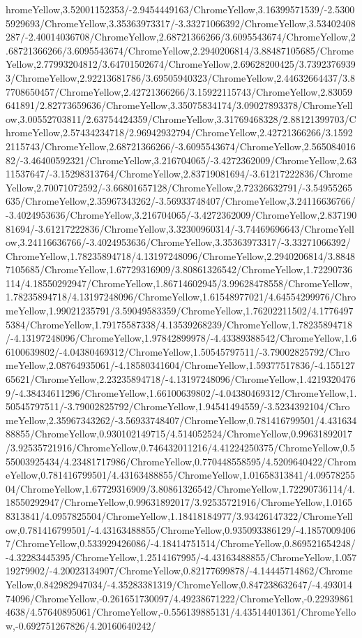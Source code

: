 {\begin{tikzternal}
hromeYellow,3.52001152353/-2.9454449163/ChromeYellow,3.16399571539/-2.53005929693/ChromeYellow,3.35363973317/-3.33271066392/ChromeYellow,3.53402408287/-2.40014036708/ChromeYellow,2.68721366266/3.6095543674/ChromeYellow,2.68721366266/3.6095543674/ChromeYellow,2.2940206814/3.88487105685/ChromeYellow,2.77993204812/3.64701502674/ChromeYellow,2.69628200425/3.73923769393/ChromeYellow,2.92213681786/3.69505940323/ChromeYellow,2.44632664437/3.87708650457/ChromeYellow,2.42721366266/3.15922115743/ChromeYellow,2.83059641891/2.82773659636/ChromeYellow,3.35075834174/3.09027893378/ChromeYellow,3.00552703811/2.63754424359/ChromeYellow,3.31769468328/2.88121399703/ChromeYellow,2.57434234718/2.96942932794/ChromeYellow,2.42721366266/3.15922115743/ChromeYellow,2.68721366266/-3.6095543674/ChromeYellow,2.56508401682/-3.46400592321/ChromeYellow,3.216704065/-3.4272362009/ChromeYellow,2.6311537647/-3.15298313764/ChromeYellow,2.83719081694/-3.61217222836/ChromeYellow,2.70071072592/-3.66801657128/ChromeYellow,2.72326632791/-3.54955265635/ChromeYellow,2.35967343262/-3.56933748407/ChromeYellow,3.24116636766/-3.4024953636/ChromeYellow,3.216704065/-3.4272362009/ChromeYellow,2.83719081694/-3.61217222836/ChromeYellow,3.32300960314/-3.74469696643/ChromeYellow,3.24116636766/-3.4024953636/ChromeYellow,3.35363973317/-3.33271066392/ChromeYellow,1.78235894718/4.13197248096/ChromeYellow,2.2940206814/3.88487105685/ChromeYellow,1.67729316909/3.80861326542/ChromeYellow,1.72290736114/4.18550292947/ChromeYellow,1.86714602945/3.99628478558/ChromeYellow,1.78235894718/4.13197248096/ChromeYellow,1.61548977021/4.64554299976/ChromeYellow,1.99021235791/3.59049583359/ChromeYellow,1.76202211502/4.17764975384/ChromeYellow,1.79175587338/4.13539268239/ChromeYellow,1.78235894718/-4.13197248096/ChromeYellow,1.97842899978/-4.43389388542/ChromeYellow,1.66100639802/-4.04380469312/ChromeYellow,1.50545797511/-3.79002825792/ChromeYellow,2.08764935061/-4.18580341604/ChromeYellow,1.59377517836/-4.15512765621/ChromeYellow,2.23235894718/-4.13197248096/ChromeYellow,1.42193204769/-4.38434611296/ChromeYellow,1.66100639802/-4.04380469312/ChromeYellow,1.50545797511/-3.79002825792/ChromeYellow,1.94541494559/-3.5234392104/ChromeYellow,2.35967343262/-3.56933748407/ChromeYellow,0.781416799501/4.43163488855/ChromeYellow,0.930102149715/4.514052524/ChromeYellow,0.99631892017/3.92535721916/ChromeYellow,0.746432011216/4.41224250375/ChromeYellow,0.555003925434/4.23481717986/ChromeYellow,0.770448558595/4.5209640422/ChromeYellow,0.781416799501/4.43163488855/ChromeYellow,1.01658313841/4.0957825504/ChromeYellow,1.67729316909/3.80861326542/ChromeYellow,1.72290736114/4.18550292947/ChromeYellow,0.99631892017/3.92535721916/ChromeYellow,1.01658313841/4.0957825504/ChromeYellow,1.18418184977/3.93426147322/ChromeYellow,0.781416799501/-4.43163488855/ChromeYellow,0.935093386129/-4.18570094067/ChromeYellow,0.533929426086/-4.18414751514/ChromeYellow,0.869521654248/-4.32283445395/ChromeYellow,1.2514167995/-4.43163488855/ChromeYellow,1.05719279902/-4.20023134907/ChromeYellow,0.82177699878/-4.14445714862/ChromeYellow,0.842982947034/-4.35283381319/ChromeYellow,0.847238632647/-4.49301474096/ChromeYellow,-0.261651730097/4.49238671222/ChromeYellow,-0.229398614638/4.57640895061/ChromeYellow,-0.556139885131/4.43514401361/ChromeYellow,-0.692751267826/4.20160640242/
\end{tikzternal}}
